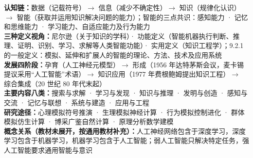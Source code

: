 \documentclass[a4paper,11pt]{article}
\begin{document}

\begin{knowmap}
\textbf{认知链：}数据（记载符号）$\rightarrow$ 信息（减少不确定性）$\rightarrow$ 知识（规律化认识）$\rightarrow$ 智能（获取并运用知识解决问题的能力）；智能的三点共识：感知能力 · 记忆和思维能力 · 学习能力、自适应能力及行为能力\\[2pt]
\textbf{三种定义视角：}尼尔逊（关于知识的学科）· 功能定义（智能机器执行判断、推理、证明、识别、学习、求解等人类智能功能）· 实用定义（知识工程学）；9.2.1 的一般定义：模拟、延伸和扩展人的智能的理论、方法、技术及应用系统\\[2pt]
\textbf{发展四阶段：}孕育（人工神经元模型）$\rightarrow$ 形成（1956 年达特茅斯会议，麦卡锡提议采用“人工智能”术语）$\rightarrow$ 知识应用（1977 年费根鲍姆提出知识工程）$\rightarrow$ 综合集成（20 世纪 80 年代末起）\\[2pt]
\textbf{主要内容八类：}搜索与求解 · 学习与发现 · 知识与推理 · 发明与创造 · 感知与交流 · 记忆与联想 · 系统与建造 · 应用与工程\\[2pt]
\textbf{研究途径：}心理模拟符号推演 · 生理模拟神经计算 · 行为模拟控制进化 · 群体模拟仿生计算 · 博采广鉴自然计算 · 原理分析数学建模\\[2pt]
\textbf{概念关系（教材未展开，按通用教材补充）：}人工神经网络包含于深度学习，深度学习包含于机器学习，机器学习包含于人工智能；弱人工智能只解决特定任务，强人工智能要求通用智能与意识
\end{knowmap}
\end{document}
